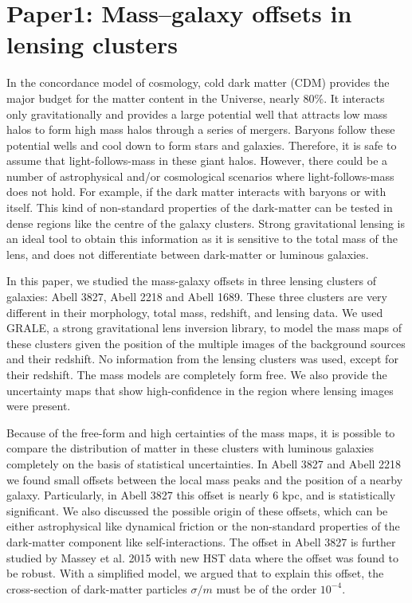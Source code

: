 \chapter{Paper1: Mass–galaxy offsets in lensing clusters}\label{paper:massgalaxyoffsets}

In the concordance model of cosmology, cold dark matter (CDM) provides the major
budget for the matter content in the Universe, nearly 80$\%$. 
It interacts only gravitationally and provides a large potential well that
attracts low mass halos to form high mass halos
through a series of mergers. Baryons follow these potential wells
and cool down to form stars and galaxies. Therefore, it is safe to assume
that light-follows-mass in these giant halos. However, there could be a number of
astrophysical and/or cosmological scenarios where light-follows-mass does not hold. 
For example, if the dark matter interacts with baryons or with itself. This
kind of non-standard properties of the dark-matter can be tested in 
dense regions like the centre of the galaxy clusters. Strong gravitational lensing is 
an ideal tool to obtain this information as it is sensitive to the total
mass of the lens, and does not differentiate between dark-matter or luminous
galaxies.

In this paper, we studied the mass-galaxy offsets in three lensing clusters of galaxies:
Abell 3827, Abell 2218 and Abell 1689. These three clusters are very different in 
their morphology, total mass, redshift, and lensing data. We used GRALE, a strong
gravitational lens inversion library, to model the mass maps of these clusters given
the position of the multiple images of the background sources 
and their redshift. No information
from the lensing clusters was used, except for their redshift. The
mass models are completely form free. We also provide the uncertainty
maps that show high-confidence in the region where lensing images were present. 

Because of the free-form and high certainties of the mass maps, 
it is possible to compare the distribution
of matter in these clusters with luminous galaxies
completely on the basis of statistical uncertainties. In Abell 3827 and
Abell 2218 we found small offsets between the local mass peaks and the
position of a nearby galaxy. Particularly, in Abell 3827 this offset is nearly 6 kpc,
and is statistically significant. We also discussed the possible origin 
of these offsets, which can be either astrophysical like dynamical
friction or the non-standard properties of the dark-matter component like
self-interactions. 
The offset in Abell 3827 is further studied by Massey et al. 2015 with new HST
data where the offset was found to be robust. With a simplified model, we argued that
to explain this offset, the cross-section of dark-matter particles 
$\sigma/m$ must be of the order $10^{-4}$.

